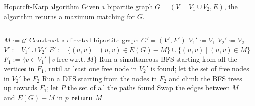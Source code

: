 \documentclass[a4paper, 12pt]{report}
\begin{document}
    \begin{framedalgo}{Hopcroft-Karp algorithm}
        Given a bipartite graph $G = (V = V_1 \cup V_2, E)$, the algorithm returns a maximum matching for $G$. \\
        \hrule

        \quad
        \begin{algorithmic}[1]
                \State $M := \varnothing$
                \State Construct a directed bipartite graph $G' = (V', E')$
                \State $V_1' := V_1$
                \State $V_2' := V_2$
                \State $V' := V_1' \cup V_2'$
                \State $E' := \{(u, v) \mid (u, v) \in E(G) - M\} \cup \{(u, v) \mid (u, v) \in M\}$ 
                \State $F_1 := \{v \in V_1' \mid v \mathrm{\ free \ w.r.t. \ } M\}$
                \Do
                    \State Run a simultaneous BFS starting from all the vertices in $F_1$, until at least one free node in $V_2'$ is found; let the set of free nodes in $V_2'$ be $F_2$
                    \State Run a DFS starting from the nodes in $F_2$ and climb the BFS trees up towards $F_1$; let $P$ the set of all the paths found
                        \State Swap the edges between $M$ and $E(G) - M$ in $p$
                    \EndFor
                \State \textbf{return} $M$
            \EndFunction
        \end{algorithmic}
    \end{framedalgo}
\end{document}
